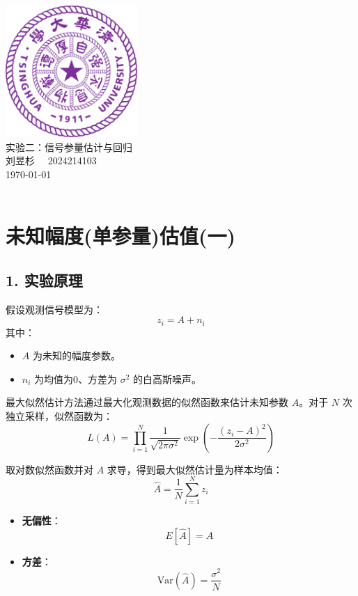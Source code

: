 \documentclass[12pt]{ctexart}
\begin{document}
\begin{titlepage}
    \begin{center}
        \includegraphics[width=5cm]{tsinghua_logo.png}\\[4cm]  %
        {\Huge 实验二：信号参量估计与回归} \\[4cm]
        {\large 刘昱杉  \ \  2024214103}\\[6cm]
        {\normalsize \today}\\[1cm]
        \vfill
        \\

    \end{center}
\end{titlepage}

\section*{未知幅度(单参量)估值(一)}

\subsection*{1. 实验原理}

假设观测信号模型为：
\[
z_i = A + n_i
\]
其中：
\begin{itemize}
    \item \( A \) 为未知的幅度参数。
    \item \( n_i \) 为均值为0、方差为 \( \sigma^2 \) 的白高斯噪声。
\end{itemize}

最大似然估计方法通过最大化观测数据的似然函数来估计未知参数 \( A \)。对于 \( N \) 次独立采样，似然函数为：
\[
L(A) = \prod_{i=1}^{N} \frac{1}{\sqrt{2\pi\sigma^2}} \exp\left(-\frac{(z_i - A)^2}{2\sigma^2}\right)
\]

取对数似然函数并对 \( A \) 求导，得到最大似然估计量为样本均值：
\[
\hat{A} = \frac{1}{N} \sum_{i=1}^{N} z_i
\]
\begin{itemize}
    \item \textbf{无偏性}：
    \[
    E[\hat{A}] = A
    \]
    \item \textbf{方差}：
    \[
    \text{Var}(\hat{A}) = \frac{\sigma^2}{N}
    \]
\end{itemize}
\end{document}
